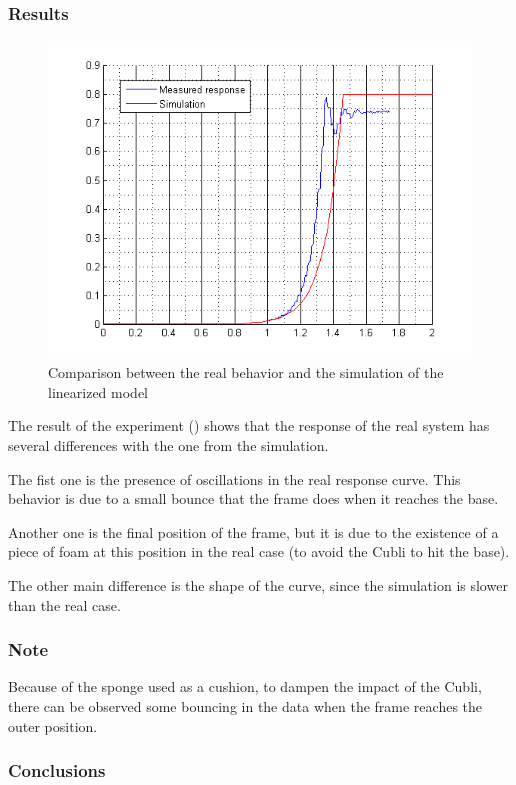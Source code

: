 \subsubsection{Results}
\begin{figure}[H] 
	\centering 
	\includegraphics[scale=0.9]{figures/comparisonRealModel}
	\caption{Comparison between the real behavior and the simulation of the linearized model}
	\label{comparisonRealModel}
\end{figure} 

The result of the experiment () shows that the response of the real system has several differences with the one from the simulation.

The fist one is the presence of oscillations in the real response curve. This behavior is due to a small bounce that the frame does when it reaches the base.

Another one is the final position of the frame, but it is due to the existence of a piece of foam at this position in the real case (to avoid the Cubli to hit the base).

The other main difference is the shape of the curve, since the simulation is slower than the real case.

\subsubsection{Note}
Because of the sponge used as a cushion, to dampen the impact of the Cubli, there can be observed some bouncing in the data when the frame reaches the outer position.

\subsubsection{Conclusions}


